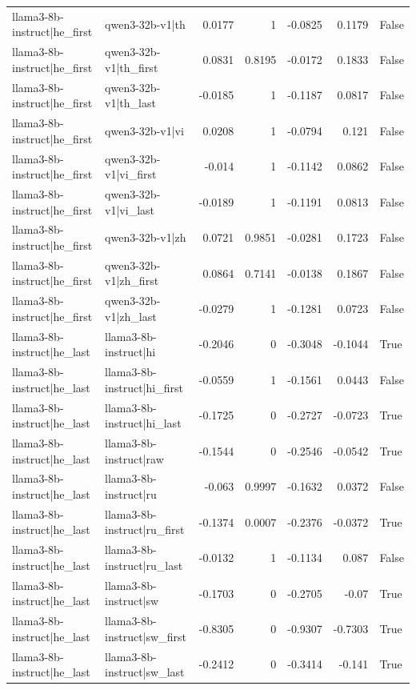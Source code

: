 \begin{table}
\begin{tabular}{l l r r r r l}
llama3-8b-instruct|he_first & qwen3-32b-v1|th & 0.0177 & 1 & -0.0825 & 0.1179 & False \\
llama3-8b-instruct|he_first & qwen3-32b-v1|th_first & 0.0831 & 0.8195 & -0.0172 & 0.1833 & False \\
llama3-8b-instruct|he_first & qwen3-32b-v1|th_last & -0.0185 & 1 & -0.1187 & 0.0817 & False \\
llama3-8b-instruct|he_first & qwen3-32b-v1|vi & 0.0208 & 1 & -0.0794 & 0.121 & False \\
llama3-8b-instruct|he_first & qwen3-32b-v1|vi_first & -0.014 & 1 & -0.1142 & 0.0862 & False \\
llama3-8b-instruct|he_first & qwen3-32b-v1|vi_last & -0.0189 & 1 & -0.1191 & 0.0813 & False \\
llama3-8b-instruct|he_first & qwen3-32b-v1|zh & 0.0721 & 0.9851 & -0.0281 & 0.1723 & False \\
llama3-8b-instruct|he_first & qwen3-32b-v1|zh_first & 0.0864 & 0.7141 & -0.0138 & 0.1867 & False \\
llama3-8b-instruct|he_first & qwen3-32b-v1|zh_last & -0.0279 & 1 & -0.1281 & 0.0723 & False \\
llama3-8b-instruct|he_last & llama3-8b-instruct|hi & -0.2046 & 0 & -0.3048 & -0.1044 & True \\
llama3-8b-instruct|he_last & llama3-8b-instruct|hi_first & -0.0559 & 1 & -0.1561 & 0.0443 & False \\
llama3-8b-instruct|he_last & llama3-8b-instruct|hi_last & -0.1725 & 0 & -0.2727 & -0.0723 & True \\
llama3-8b-instruct|he_last & llama3-8b-instruct|raw & -0.1544 & 0 & -0.2546 & -0.0542 & True \\
llama3-8b-instruct|he_last & llama3-8b-instruct|ru & -0.063 & 0.9997 & -0.1632 & 0.0372 & False \\
llama3-8b-instruct|he_last & llama3-8b-instruct|ru_first & -0.1374 & 0.0007 & -0.2376 & -0.0372 & True \\
llama3-8b-instruct|he_last & llama3-8b-instruct|ru_last & -0.0132 & 1 & -0.1134 & 0.087 & False \\
llama3-8b-instruct|he_last & llama3-8b-instruct|sw & -0.1703 & 0 & -0.2705 & -0.07 & True \\
llama3-8b-instruct|he_last & llama3-8b-instruct|sw_first & -0.8305 & 0 & -0.9307 & -0.7303 & True \\
llama3-8b-instruct|he_last & llama3-8b-instruct|sw_last & -0.2412 & 0 & -0.3414 & -0.141 & True \\

\end{tabular}
\end{table}
